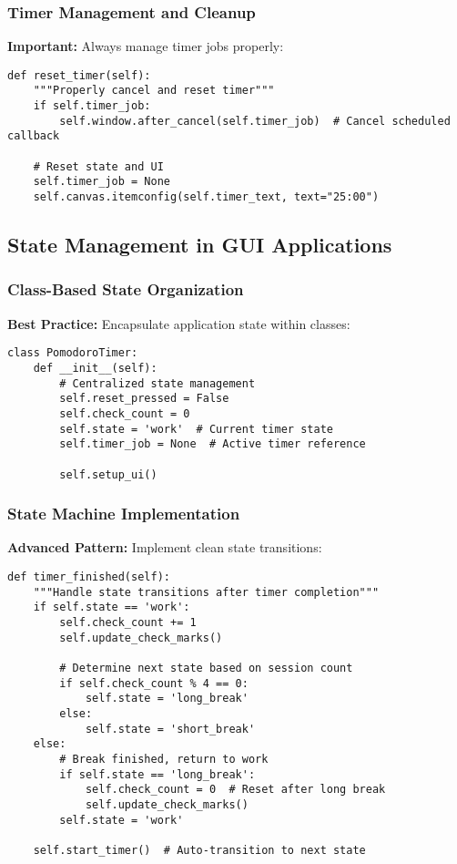 \documentclass[12pt,a4paper]{article}
\begin{document}
\subsubsection{Timer Management and Cleanup}
\textbf{Important:} Always manage timer jobs properly:

\begin{lstlisting}
def reset_timer(self):
    """Properly cancel and reset timer"""
    if self.timer_job:
        self.window.after_cancel(self.timer_job)  # Cancel scheduled callback
    
    # Reset state and UI
    self.timer_job = None
    self.canvas.itemconfig(self.timer_text, text="25:00")
\end{lstlisting}

\subsection{State Management in GUI Applications}

\subsubsection{Class-Based State Organization}
\textbf{Best Practice:} Encapsulate application state within classes:

\begin{lstlisting}
class PomodoroTimer:
    def __init__(self):
        # Centralized state management
        self.reset_pressed = False
        self.check_count = 0
        self.state = 'work'  # Current timer state
        self.timer_job = None  # Active timer reference
        
        self.setup_ui()
\end{lstlisting}

\subsubsection{State Machine Implementation}
\textbf{Advanced Pattern:} Implement clean state transitions:

\begin{lstlisting}
def timer_finished(self):
    """Handle state transitions after timer completion"""
    if self.state == 'work':
        self.check_count += 1
        self.update_check_marks()
        
        # Determine next state based on session count
        if self.check_count % 4 == 0:
            self.state = 'long_break'
        else:
            self.state = 'short_break'
    else:
        # Break finished, return to work
        if self.state == 'long_break':
            self.check_count = 0  # Reset after long break
            self.update_check_marks()
        self.state = 'work'
    
    self.start_timer()  # Auto-transition to next state
\end{lstlisting}
\end{document}

